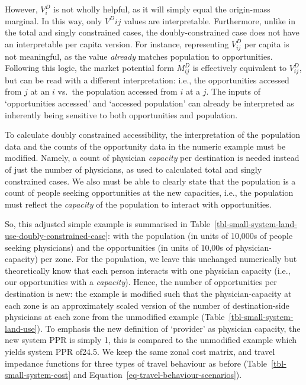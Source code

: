 \documentclass[
]{article}
\begin{document}
However, \(V^D_{i}\) is not wholly helpful, as it will simply equal the
origin-mass marginal. In this way, only \(V^D{ij}\) values are
interpretable. Furthermore, unlike in the total and singly constrained
cases, the doubly-constrained case does not have an interpretable per
capita version. For instance, representing \(V_{ij}^D\) per capita is
not meaningful, as the value \emph{already} matches population to
opportunities. Following this logic, the market potential form
\(M^D_{ij}\) is effectively equivalent to \(V_{ij}^D\), but can be read
with a different interpretation: i.e., the opportunities accessed from
\(j\) at an \(i\) vs.~the population accessed from \(i\) at a \(j\). The
inputs of `opportunities accessed' and `accessed population' can already
be interpreted as inherently being sensitive to both opportunities and
population.

To calculate doubly constrained accessibility, the interpretation of the
population data and the counts of the opportunity data in the numeric
example must be modified. Namely, a count of physician \emph{capacity}
per destination is needed instead of just the number of physicians, as
used to calculated total and singly constrained cases. We also must be
able to clearly state that the population is a count of people seeking
opportunities at the new capacities, i.e., the population must reflect
the \emph{capacity} of the population to interact with opportunities.

So, this adjusted simple example is summarised in
Table~\ref{tbl-small-system-land-use-doubly-constrained-case}: with the
population (in units of 10,000s of people seeking physicians) and the
opportunities (in units of 10,00s of physician-capacity) per zone. For
the population, we leave this unchanged numerically but theoretically
know that each person interacts with one physician capacity (i.e., our
opportunities with a \emph{capacity}). Hence, the number of
opportunities per destination is new: the example is modified such that
the physician-capacity at each zone is an approximately scaled version
of the number of destination-side physicians at each zone from the
unmodified example (Table~\ref{tbl-small-system-land-use}). To emphasis
the new definition of `provider' as physician capacity, the new system
PPR is simply 1, this is compared to the unmodified example which yields
system PPR of24.5. We keep the same zonal cost matrix, and travel
impedance functions for three types of travel behaviour as before
(Table~\ref{tbl-small-system-cost} and
Equation~\ref{eq-travel-behaviour-scenarios}).
\end{document}
